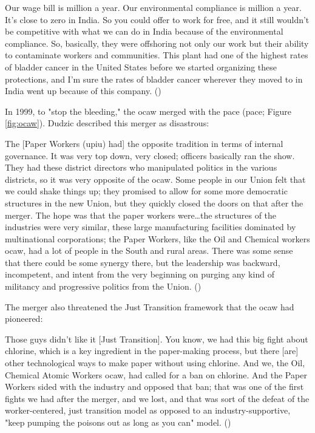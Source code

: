 \documentclass[12pt]{article}
\renewenvironment{quote}
  {\list{}{\leftmargin=\parindent\rightmargin=0pt}%
   \item\relax}
  {\endlist}
\begin{document}
\begin{quote}
Our wage bill is  million a year. Our environmental compliance is  million a year. It's close to zero in India. So you could offer to work for free, and it still wouldn't be competitive with what we can do in India because of the environmental compliance. So, basically, they were offshoring not only our work but their ability to contaminate workers and communities. This plant had one of the highest rates of bladder cancer in the United States before we started organizing these protections, and I'm sure the rates of bladder cancer wherever they moved to in India went up because of this company. (\citeyear{dudzicInterview2024})
\end{quote}

In 1999, to "stop the bleeding," the \acrshort{ocaw} merged with the \acrlong{pace} (\acrshort{pace}; Figure \ref{fig:ocaw}). Dudzic described this merger as disastrous:

\begin{quote}
The [Paper Workers (\acrshort{upiu}) had] the opposite tradition in terms of internal governance. It was very top down, very closed; officers basically ran the show. They had these district directors who manipulated politics in the various districts, so it was very opposite of the \acrshort{ocaw}. Some people in our Union felt that we could shake things up; they promised to allow for some more democratic structures in the new Union, but they quickly closed the doors on that after the merger. The hope was that the paper workers were\ldots the structures of the industries were very similar, these large manufacturing facilities dominated by multinational corporations; the Paper Workers, like the Oil and Chemical workers \acrshort{ocaw}, had a lot of people in the South and rural areas. There was some sense that there could be some synergy there, but the leadership was backward, incompetent, and intent from the very beginning on purging any kind of militancy and progressive politics from the Union. (\citeyear{dudzicInterview2024})
\end{quote}

\noindent The merger also threatened the Just Transition framework that the \acrshort{ocaw} had pioneered:

\begin{quote}
Those guys didn't like it [Just Transition]. You know, we had this big fight about chlorine, which is a key ingredient in the paper-making process, but there [are] other technological ways to make paper without using chlorine. And we, the Oil, Chemical Atomic Workers \acrshort{ocaw}, had called for a ban on chlorine. And the Paper Workers sided with the industry and opposed that ban; that was one of the first fights we had after the merger, and we lost, and that was sort of the defeat of the worker-centered, just transition model as opposed to an industry-supportive, "keep pumping the poisons out as long as you can" model. (\citeyear{dudzicInterview2024})
\end{quote}
\end{document}
